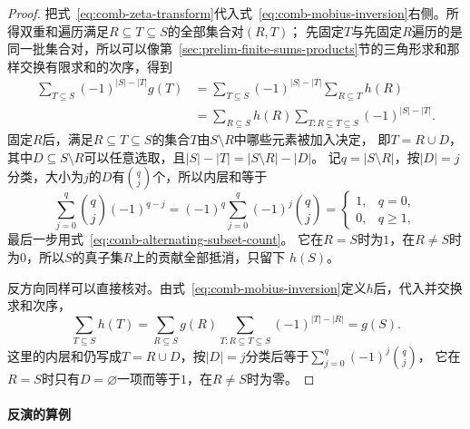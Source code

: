 \begin{proof}
把式~\eqref{eq:comb-zeta-transform}代入式~\eqref{eq:comb-mobius-inversion}右侧。所得双重和遍历满足$R\subseteq T\subseteq S$的全部集合对$(R,T)$；
先固定$T$与先固定$R$遍历的是同一批集合对，所以可以像第~\ref{sec:prelim-finite-sums-products}节的三角形求和那样交换有限求和的次序，得到
\begin{align*}
  \sum_{T\subseteq S}(-1)^{|S|-|T|}g(T)
  &=
  \sum_{T\subseteq S}(-1)^{|S|-|T|}
  \sum_{R\subseteq T}h(R)\\
  &=
  \sum_{R\subseteq S}h(R)
  \sum_{T:R\subseteq T\subseteq S}
  (-1)^{|S|-|T|}.
\end{align*}
固定$R$后，满足$R\subseteq T\subseteq S$的集合$T$由$S\setminus R$中哪些元素被加入决定，
即$T=R\cup D$，其中$D\subseteq S\setminus R$可以任意选取，且$|S|-|T|=|S\setminus R|-|D|$。
记$q=|S\setminus R|$，按$|D|=j$分类，大小为$j$的$D$有$\binom qj$个，所以内层和等于
\[
  \sum_{j=0}^{q}\binom{q}{j}(-1)^{q-j}
  =(-1)^q\sum_{j=0}^q(-1)^j\binom qj
  =\begin{cases}1,&q=0,\\0,&q\geq1,\end{cases}
\]
最后一步用式~\eqref{eq:comb-alternating-subset-count}。
它在$R=S$时为$1$，在$R\neq S$时为$0$，所以$S$的真子集$R$上的贡献全部抵消，只留下
$h(S)$。

反方向同样可以直接核对。由式~\eqref{eq:comb-mobius-inversion}定义$h$后，代入并交换求和次序，
\[
 \sum_{T\subseteq S}h(T)
 =\sum_{R\subseteq S}g(R)
   \sum_{T:R\subseteq T\subseteq S}(-1)^{|T|-|R|}
 =g(S).
\]
这里的内层和仍写成$T=R\cup D$，按$|D|=j$分类后等于$\sum_{j=0}^q(-1)^j\binom qj$，
它在$R=S$时只有$D=\varnothing$一项而等于$1$，在$R\neq S$时为零。
\end{proof}

\paragraph{反演的算例}

